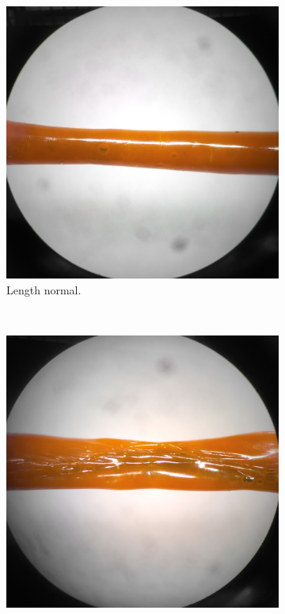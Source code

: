 

\begin{figure}[h!]
        \centering
        \begin{subfigure}[b]{0.3\textwidth}
                \includegraphics[width=\textwidth]{./figures/20-og-normal}
                \caption{Length normal.}
                \label{fig:20-og-normal}
        \end{subfigure}%
        ~ %
        \begin{subfigure}[b]{0.3\textwidth}
                \includegraphics[width=\textwidth]{./figures/20-og-defect}

\end{subfigure}
\end{figure}

